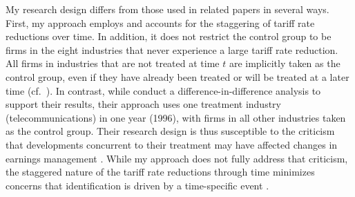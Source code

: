 \documentclass[notitlepage, 12pt]{article}
\begin{document}
%
\begin{comment}
My research design differs from those used in related papers. \citet{bc:2012} also use import tariff reductions as exogenous variation in competitive intensity. However, they average each firms' variable each year to form industry-year variables. Similarly, \citet{kst:2012} compute average values for all their variables for each firm over their sample period such that their data is at the firm level. By conducting my analysis at the firm-year level, I am able to control for unobserved time-invariant firm-specific heterogeneity with firm fixed effects as well as unobserved firm-invariant time-specific heterogeneity with year fixed effects.
\newline

\noindent In addition, my research design employs multiple treatments staggered across time. \citet{kst:2012} conduct a difference-in-difference analysis using one treatment industry (telecommunications) in one year (1996), with firms in all other industries taken as the control group. Although their treatment does not affect all firms during the same time period, the treatment occurs in one time period and hence their research design is susceptible to the criticism that developments concurrent to their treatment may have affected changes in earnings management (cf.\ \citet*{cdl:2008}). While my approach does not completely address that criticism, the staggered nature of the tariff rate reductions through time minimizes concerns that identification is driven by a time-specific event that occurred in a given year.
\end{comment}
%

\noindent My research design differs from those used in related papers in several ways. First, my approach employs and accounts for the staggering of tariff rate reductions over time. In addition, it does not restrict the control group to be firms in the eight industries that never experience a large tariff rate reduction. All firms in industries that are not treated at time $t$ are implicitly taken as the control group, even if they have already been treated or will be treated at a later time (cf.\ \citet{bm:2003}). In contrast, while \citet{kst:2012} conduct a difference-in-difference analysis to support their results, their approach uses one treatment industry (telecommunications) in one year (1996), with firms in all other industries taken as the control group. Their research design is thus susceptible to the criticism that developments concurrent to their treatment may have affected changes in earnings management \citep{cdl:2008}. While my approach does not fully address that criticism, the staggered nature of the tariff rate reductions through time minimizes concerns that identification is driven by a time-specific event \citep{valta:2012}.
\newline
\end{document}
